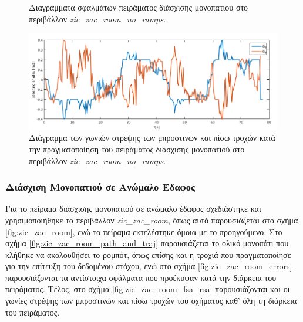 \begin{figure}[!ht]
	\caption{Διαγράμματα σφαλμάτων πειράματος διάσχισης μονοπατιού στο περιβάλλον \textit{zic{\_}zac{\_}room{\_}no{\_}ramps}.}
	\label{fig:zic_zac_room_no_ramps_errors}
\end{figure}

\begin{figure}[!ht]
	\centering
	\includegraphics[width=0.9\linewidth]{Chapters/Chapter5/Figures/ptc_experiments/plots/zic_zac_room_no_ramps/fsa_rsa.png}
	\caption{Διάγραμμα των γωνιών στρέψης των μπροστινών και πίσω τροχών κατά την πραγματοποίηση του πειράματος διάσχισης μονοπατιού στο περιβάλλον \textit{zic{\_}zac{\_}room{\_}no{\_}ramps}.}
	\label{fig:zic_zac_room_no_ramps_fsa_rsa}
\end{figure}

\subsubsection{Διάσχιση Μονοπατιού σε Ανώμαλο Έδαφος}
Για το πείραμα διάσχισης μονοπατιού σε ανώμαλο έδαφος σχεδιάστηκε και χρησιμοποιήθηκε το περιβάλλον \textit{zic{\_}zac{\_}room}, όπως αυτό παρουσιάζεται στο σχήμα \ref{fig:zic_zac_room}, ενώ το πείραμα εκτελέστηκε όμοια με το προηγούμενο. Στο σχήμα \ref{fig:zic_zac_room_path_and_traj} παρουσιάζεται το ολικό μονοπάτι που κλήθηκε να ακολουθήσει το ρομπότ, όπως επίσης και η τροχιά που πραγματοποίησε για την επίτευξη του δεδομένου στόχου, ενώ στο σχήμα \ref{fig:zic_zac_room_errors} παρουσιάζονται τα αντίστοιχα σφάλματα που προέκυψαν κατά την διάρκεια του πειράματος. Τέλος, στο σχήμα \ref{fig:zic_zac_room_fsa_rsa} παρουσιάζονται και οι γωνίες στρέψης των μπροστινών και πίσω τροχών του οχήματος καθ' όλη τη διάρκεια του πειράματος.

